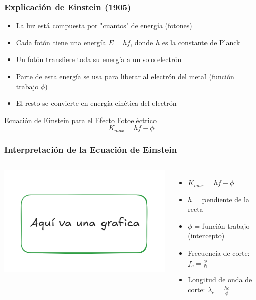\documentclass{beamer}
\begin{document}
	
	
	\begin{frame}
		\frametitle{Explicación de Einstein (1905)}
		\begin{itemize}
			\item La luz está compuesta por "cuantos" de energía (fotones)
			\item Cada fotón tiene una energía $E = hf$, donde $h$ es la constante de Planck
			\item Un fotón transfiere toda su energía a un solo electrón
			\item Parte de esta energía se usa para liberar al electrón del metal (función trabajo $\phi$)
			\item El resto se convierte en energía cinética del electrón
		\end{itemize}
		
		\begin{alertblock}{Ecuación de Einstein para el Efecto Fotoeléctrico}
			\begin{equation}
				K_{max} = hf - \phi
			\end{equation}
		\end{alertblock}
	\end{frame}
	
	\begin{frame}
		\frametitle{Interpretación de la Ecuación de Einstein}
		\begin{columns}
			\column{0.5\textwidth}
			\includegraphics[width=\textwidth]{../Imagenes/grafica_pendiente}
			
			\column{0.5\textwidth}
			\begin{itemize}
				\item $K_{max} = hf - \phi$
				\item $h$ = pendiente de la recta
				\item $\phi$ = función trabajo (intercepto)
				\item Frecuencia de corte: $f_c = \frac{\phi}{h}$
				\item Longitud de onda de corte: $\lambda_c = \frac{hc}{\phi}$
			\end{itemize}
		\end{columns}
	\end{frame}
	
\end{document}
